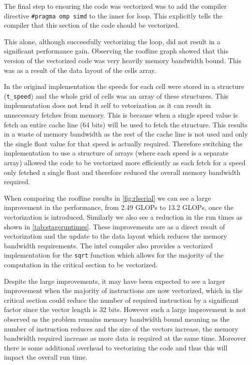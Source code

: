 \documentclass{article}
\begin{document}
\begin{multicols}{2}
The final step to ensuring the code was vectorized was to add the compiler
directive \verb|#pragma omp simd| to the inner for loop. This explicitly tells
the compiler that this section of the code should be vectorized. 

This alone, although successfully vectorizing the loop, did not result in a
significant performance gain. Observing the roofline graph showed that this
version of the vectorized code was very heavily memory bandwidth bound. This
was as a result of the data layout of the cells array. 

In the original implementation the speeds for each cell were stored in a
structure (\verb|t_speed|) and the whole grid of cells was an array of these
structures. This implementation does not lend it self to vetorization as it
can result in unnecessary fetches from memory. This is because when a single
speed value is fetch an entire cache line (64 bits) will be used to fetch the
structure. This results in a waste of memory bandwidth as the rest of the
cache line is not used and only the single float value for that speed is actually
required. Therefore switching the implementation to use a structure of arrays
(where each speed is a separate array) allowed the code to be vectorized more
efficiently as each fetch for a speed only fetched a single float and therefore
reduced the overall memory bandwidth required. 

When comparing the roofline results in \autoref{fig:rlserial} we can see a
large improvement in the performance, from 2.49 GLOPs to 13.2 GLOPs, once the
vectorization is introduced. Similarly we also see a reduction in the run times
as shown in \autoref{tab:stageruntimes}. These improvements are as a direct
result of vectorization and the update to the data layout which reduces the
memory bandwidth requirements. The intel compiler also provides a vectorized
implementation for the \verb|sqrt| function which allows for the majority of
the computation in the critical section to be vectorized.

Despite the large improvements, it may have been expected to see a larger
improvement when the majority of instructions are now vectorized, which in the
critical section could reduce the number of required instruction by a
significant factor since the vector length is 32 bits. However such a large
improvement is not observed as the problem remains memory bandwidth bound
meaning as the number of instruction reduces and the size of the vectors
increase, the memory bandwidth required increase as more data is required at
the same time. Moreover there is some additional overhead to vectorizing the
code and thus this will impact the overall run time.


\end{multicols}
\end{document}

